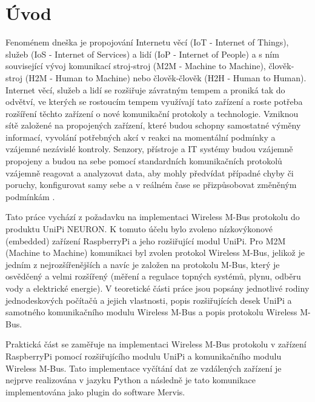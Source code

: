 \chapter*{Úvod}
{}

Fenoménem dneška je propojování Internetu věcí (IoT - Internet of Things), služeb (IoS - Internet of Services) a lidí (IoP - Internet of People) a s ním související vývoj komunikací stroj-stroj (M2M - Machine to Machine), člověk-stroj (H2M - Human to Machine) nebo člověk-člověk (H2H - Human to Human). Internet věcí, služeb a lidí se rozšiřuje závratným tempem a proniká tak do odvětví, ve kterých se rostoucím tempem využívají tato zařízení a roste potřeba rozšíření těchto zařízení o nové komunikační protokoly a technologie. Vzniknou sítě založené na propojených zařízení, které budou schopny samostatné výměny informací, vyvolání potřebných akcí v reakci na momentální podmínky a vzájemné nezávislé kontroly. Senzory, přístroje a IT systémy budou vzájemně propojeny a budou na sebe pomocí standardních komunikačních protokolů vzájemně reagovat a analyzovat data, aby mohly předvídat případné chyby či poruchy, konfigurovat samy sebe a v reálném čase se přizpůsobovat změněným podmínkám \cite{Prumysl4PDF,Prumysl4Web}.

Tato práce vychází z požadavku na implementaci Wireless M-Bus protokolu do produktu UniPi NEURON. K tomuto účelu bylo zvoleno nízkovýkonové (embedded) zařízení RaspberryPi a jeho rozšiřující modul UniPi. Pro M2M (Machine to Machine) komunikaci byl zvolen protokol Wireless M-Bus, jelikož je jedním z nejrozšířenějších a navíc je založen na protokolu M-Bus, který je osvědčený a velmi rozšířený (měření a regulace topných systémů, plynu, odběru vody a elektrické energie). V teoretické části práce jsou popsány jednotlivé rodiny jednodeskových počítačů a jejich vlastnosti, popis rozšiřujících desek UniPi a samotného komunikačního modulu Wireless M-Bus a popis protokolu Wireless M-Bus. 

Praktická část se zaměřuje na implementaci Wireless M-Bus protokolu v zařízení RaspberryPi pomocí rozšiřujícího modulu UniPi a komunikačního modulu Wireless M-Bus. Tato implementace vyčítání dat ze vzdálených zařízení je nejprve realizována v jazyku Python a následně je tato komunikace implementována jako plugin do software Mervis.
 
